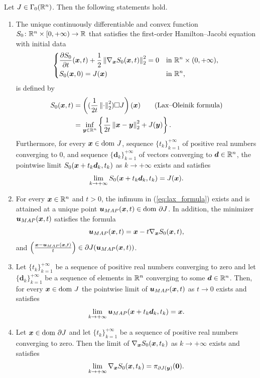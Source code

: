 \begin{prop}\label{thm:e_u_nonvisc_hj}
Let $J\in\Gamma_0(\mathbb{R}^n)$. Then the following statements hold.
\begin{enumerate}
\item[(i)]  The unique continuously differentiable and convex function $S_0\colon\mathbb{R}^n\times[0,+\infty)\to\mathbb{R}$ that satisfies the first-order Hamilton--Jacobi equation with initial data
\begin{equation}
\begin{dcases}
\frac{\partial S_0}{\partial t}(\boldsymbol{x},t)+\frac{1}{2}\left\Vert{\nabla_{\boldsymbol{x}}S_0(\boldsymbol{x},t)} \right\Vert_{2}^{2}=0 & \mbox{in }\mathbb{R}^n\times(0,+\infty),\\
S_0(\boldsymbol{x},0)=J(\boldsymbol{x}) & \mbox{in }\mathbb{R}^n,
\end{dcases}\label{eq:hj_non_visc_pde}
\end{equation}
is defined by
\begin{align}
S_0(\boldsymbol{x},t) & = \left((\frac{1}{2t}\left\Vert{\cdot} \right\Vert_{2}^{2}) \Box J\right)(\boldsymbol{x}) \qquad(\mbox{Lax--Oleinik formula}) \\
 & =\inf_{\boldsymbol{y}\in\mathbb{R}^n}\left\{ \frac{1}{2t}\left\Vert{\boldsymbol{x}-\boldsymbol{y}} \right\Vert_{2}^{2}+J(\boldsymbol{y})\right\}. \label{eq:lax_formula}
\end{align}
Furthermore, for every $\boldsymbol{x}\in\mathrm{dom~} J$, sequence $\{t_k\}_{k=1}^{+\infty}$ of positive real numbers converging to $0$, and sequence $\{\boldsymbol{d}_k\}_{k=1}^{+\infty}$ of vectors converging to $\boldsymbol{d}\in\mathbb{R}^n$, the pointwise limit $S_0(\boldsymbol{x}+t_k\boldsymbol{d}_k,t_k)$ as $k \to +\infty$ exists and satisfies
\[
\lim_{k \to +\infty} S_0(\boldsymbol{x}+t_k\boldsymbol{d}_k,t_k)=J(\boldsymbol{x}).
\]
\item[(ii)]  For every $\boldsymbol{x}\in\mathbb{R}^n$ and $t>0$, the infimum in (\ref{eq:lax_formula}) exists and is attained at a unique point $\boldsymbol{u}_{MAP}(\boldsymbol{x},t)\in\mathrm{dom~}\partial J$. In addition, the minimizer $\boldsymbol{u}_{MAP}(\boldsymbol{x},t)$ satisfies the formula
\begin{equation} \label{eq:grad_map_rep}
\boldsymbol{u}_{MAP}(\boldsymbol{x},t)=\boldsymbol{x}-t\nabla_{\boldsymbol{x}}S_0(\boldsymbol{x},t),
\end{equation}
and $\left(\frac{\boldsymbol{x}-\boldsymbol{u}_{MAP}(\boldsymbol{x},t)}{t}\right)\in\partial J(\boldsymbol{u}_{MAP}(\boldsymbol{x},t))$.
\item[(iii)] Let $\{t_k\}_{k=1}^{+\infty}$ be a sequence of positive real numbers converging to zero and let $\{\boldsymbol{d}_k\}_{k=1}^{+\infty}$ be a sequence of elements in $\mathbb{R}^n$ converging to some $\boldsymbol{d} \in \mathbb{R}^n$. Then, for every $\boldsymbol{x} \in \mathrm{dom~} J$ the pointwise limit of $\boldsymbol{u}_{MAP}(\boldsymbol{x},t)$ as $t\to0$ exists and satisfies
\[
\lim_{k\to +\infty} \boldsymbol{u}_{MAP}(\boldsymbol{x} + t_k\boldsymbol{d}_{k},t_k)=\boldsymbol{x}.
\]
\item[(iv)] Let $\boldsymbol{x} \in \mathrm{dom~}\partial J$ and let $\{t_k\}_{k=1}^{+\infty}$ be a sequence of positive real numbers converging to zero. Then the limit of $\nabla_{\boldsymbol{x}}S_0(\boldsymbol{x},t_k)$ as $k\to +\infty$ exists and satisfies
\begin{equation} \label{eq:grad_limit_subdiff}
    \lim_{k\to +\infty}\nabla_{\boldsymbol{x}}S_0(\boldsymbol{x},t_k) = \pi_{\partial J(\boldsymbol{y})}(\boldsymbol{0}).
\end{equation}
\end{enumerate}
\end{prop}